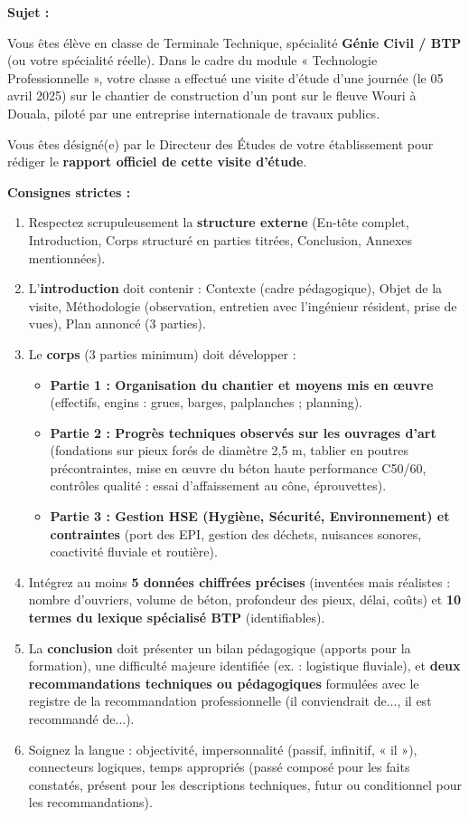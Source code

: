 \documentclass[11pt]{article}
\begin{document}
\begin{exercice}
\textbf{Sujet :}

Vous êtes élève en classe de Terminale Technique, spécialité \textbf{Génie Civil / BTP} (ou votre spécialité réelle). Dans le cadre du module « Technologie Professionnelle », votre classe a effectué une visite d'étude d'une journée (le 05 avril 2025) sur le chantier de construction d'un pont sur le fleuve Wouri à Douala, piloté par une entreprise internationale de travaux publics.

Vous êtes désigné(e) par le Directeur des Études de votre établissement pour rédiger le \textbf{rapport officiel de cette visite d'étude}.

\textbf{Consignes strictes :}
\begin{enumerate}
\item Respectez scrupuleusement la \textbf{structure externe} (En-tête complet, Introduction, Corps structuré en parties titrées, Conclusion, Annexes mentionnées).
\item L'\textbf{introduction} doit contenir : Contexte (cadre pédagogique), Objet de la visite, Méthodologie (observation, entretien avec l'ingénieur résident, prise de vues), Plan annoncé (3 parties).
\item Le \textbf{corps} (3 parties minimum) doit développer :
\begin{itemize}
\item \textbf{Partie 1 : Organisation du chantier et moyens mis en œuvre} (effectifs, engins : grues, barges, palplanches ; planning).
\item \textbf{Partie 2 : Progrès techniques observés sur les ouvrages d'art} (fondations sur pieux forés de diamètre 2,5 m, tablier en poutres précontraintes, mise en œuvre du béton haute performance C50/60, contrôles qualité : essai d'affaissement au cône, éprouvettes).
\item \textbf{Partie 3 : Gestion HSE (Hygiène, Sécurité, Environnement) et contraintes} (port des EPI, gestion des déchets, nuisances sonores, coactivité fluviale et routière).
\end{itemize}
\item Intégrez au moins \textbf{5 données chiffrées précises} (inventées mais réalistes : nombre d'ouvriers, volume de béton, profondeur des pieux, délai, coûts) et \textbf{10 termes du lexique spécialisé BTP} (identifiables).
\item La \textbf{conclusion} doit présenter un bilan pédagogique (apports pour la formation), une difficulté majeure identifiée (ex. : logistique fluviale), et \textbf{deux recommandations techniques ou pédagogiques} formulées avec le registre de la recommandation professionnelle (il conviendrait de..., il est recommandé de...).
\item Soignez la langue : objectivité, impersonnalité (passif, infinitif, « il »), connecteurs logiques, temps appropriés (passé composé pour les faits constatés, présent pour les descriptions techniques, futur ou conditionnel pour les recommandations).
\end{enumerate}
\end{exercice}
\end{document}
